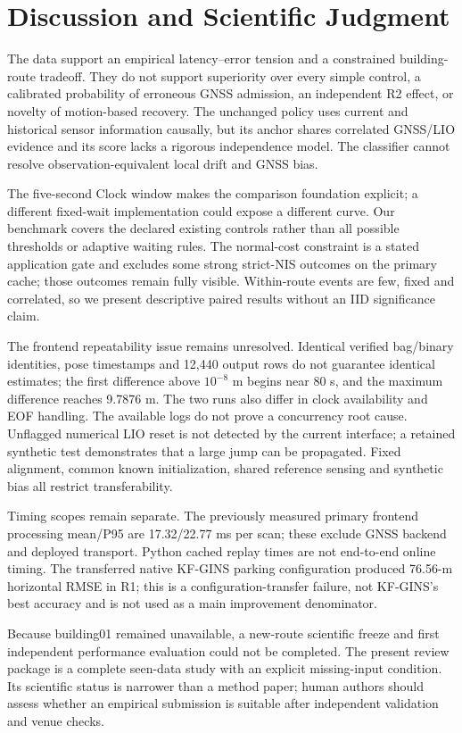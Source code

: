 \documentclass[conference]{IEEEtran}
\begin{document}
\section{Discussion and Scientific Judgment}
The data support an empirical latency--error tension and a constrained building-route tradeoff. They do not support superiority over every simple control, a calibrated probability of erroneous GNSS admission, an independent R2 effect, or novelty of motion-based recovery. The unchanged policy uses current and historical sensor information causally, but its anchor shares correlated GNSS/LIO evidence and its score lacks a rigorous independence model. The classifier cannot resolve observation-equivalent local drift and GNSS bias.

The five-second Clock window makes the comparison foundation explicit; a different fixed-wait implementation could expose a different curve. Our benchmark covers the declared existing controls rather than all possible thresholds or adaptive waiting rules. The normal-cost constraint is a stated application gate and excludes some strong strict-NIS outcomes on the primary cache; those outcomes remain fully visible. Within-route events are few, fixed and correlated, so we present descriptive paired results without an IID significance claim.

The frontend repeatability issue remains unresolved. Identical verified bag/binary identities, pose timestamps and 12,440 output rows do not guarantee identical estimates; the first difference above $10^{-8}$ m begins near 80 s, and the maximum difference reaches 9.7876 m. The two runs also differ in clock availability and EOF handling. The available logs do not prove a concurrency root cause. Unflagged numerical LIO reset is not detected by the current interface; a retained synthetic test demonstrates that a large jump can be propagated. Fixed alignment, common known initialization, shared reference sensing and synthetic bias all restrict transferability.

Timing scopes remain separate. The previously measured primary frontend processing mean/P95 are 17.32/22.77 ms per scan; these exclude GNSS backend and deployed transport. Python cached replay times are not end-to-end online timing. The transferred native KF-GINS parking configuration produced 76.56-m horizontal RMSE in R1; this is a configuration-transfer failure, not KF-GINS's best accuracy and is not used as a main improvement denominator.

Because building01 remained unavailable, a new-route scientific freeze and first independent performance evaluation could not be completed. The present review package is a complete seen-data study with an explicit missing-input condition. Its scientific status is narrower than a method paper; human authors should assess whether an empirical submission is suitable after independent validation and venue checks.
\end{document}
